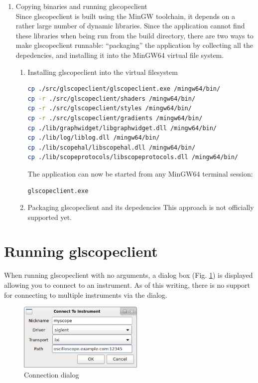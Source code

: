 \begin{enumerate}
\item Copying binaries and running glscopeclient \\
Since glscopeclient is built using the MinGW toolchain, it depends on a rather large number of dynamic libraries. Since the application cannot find these libraries when being run from the build directory, there are two ways to make glscopeclient runnable: ``packaging'' the application by collecting all the depedencies, and installing it into the MinGW64 virtual file system.

\begin{enumerate}
\item Installing glscopeclient into the virtual filesystem
\begin{lstlisting}[language=sh]
cp ./src/glscopeclient/glscopeclient.exe /mingw64/bin/
cp -r ./src/glscopeclient/shaders /mingw64/bin/
cp -r ./src/glscopeclient/styles /mingw64/bin/
cp -r ./src/glscopeclient/gradients /mingw64/bin/
cp ./lib/graphwidget/libgraphwidget.dll /mingw64/bin/
cp ./lib/log/liblog.dll /mingw64/bin/
cp ./lib/scopehal/libscopehal.dll /mingw64/bin/
cp ./lib/scopeprotocols/libscopeprotocols.dll /mingw64/bin/
\end{lstlisting}
\vspace{0.5cm}
The application can now be started from any MinGW64 terminal session:
\vspace{0.5cm}
\begin{lstlisting}[language=sh]
glscopeclient.exe
\end{lstlisting}
\vspace{0.5cm}

\item Packaging glscopeclient and its depedencies
This approach is not officially supported yet.
\end{enumerate}

\end{enumerate}


\section{Running glscopeclient}

When running glscopeclient with no arguments, a dialog box (Fig. \ref{connection-dialog}) is displayed allowing you to
connect to an instrument. As of this writing, there is no support for connecting to multiple instruments via the
dialog.

\begin{figure}[h]
\centering
\includegraphics[width=6cm]{images/connection-dialog.png}
\caption{Connection dialog}
\label{connection-dialog}
\end{figure}

